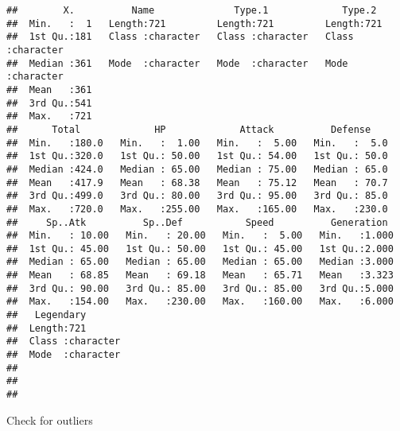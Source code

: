 \documentclass[
]{article}
\newenvironment{Shaded}{\begin{snugshade}}{\end{snugshade}}
\newcommand{\FunctionTok}[1]{\textcolor[rgb]{0.00,0.00,0.00}{#1}}
\newcommand{\NormalTok}[1]{#1}
\newcommand{\OtherTok}[1]{\textcolor[rgb]{0.56,0.35,0.01}{#1}}
\newcommand{\SpecialCharTok}[1]{\textcolor[rgb]{0.00,0.00,0.00}{#1}}
\begin{document}
\begin{Shaded}
\end{Shaded}

\begin{verbatim}
##        X.          Name              Type.1             Type.2         
##  Min.   :  1   Length:721         Length:721         Length:721        
##  1st Qu.:181   Class :character   Class :character   Class :character  
##  Median :361   Mode  :character   Mode  :character   Mode  :character  
##  Mean   :361                                                           
##  3rd Qu.:541                                                           
##  Max.   :721                                                           
##      Total             HP             Attack          Defense     
##  Min.   :180.0   Min.   :  1.00   Min.   :  5.00   Min.   :  5.0  
##  1st Qu.:320.0   1st Qu.: 50.00   1st Qu.: 54.00   1st Qu.: 50.0  
##  Median :424.0   Median : 65.00   Median : 75.00   Median : 65.0  
##  Mean   :417.9   Mean   : 68.38   Mean   : 75.12   Mean   : 70.7  
##  3rd Qu.:499.0   3rd Qu.: 80.00   3rd Qu.: 95.00   3rd Qu.: 85.0  
##  Max.   :720.0   Max.   :255.00   Max.   :165.00   Max.   :230.0  
##     Sp..Atk          Sp..Def           Speed          Generation   
##  Min.   : 10.00   Min.   : 20.00   Min.   :  5.00   Min.   :1.000  
##  1st Qu.: 45.00   1st Qu.: 50.00   1st Qu.: 45.00   1st Qu.:2.000  
##  Median : 65.00   Median : 65.00   Median : 65.00   Median :3.000  
##  Mean   : 68.85   Mean   : 69.18   Mean   : 65.71   Mean   :3.323  
##  3rd Qu.: 90.00   3rd Qu.: 85.00   3rd Qu.: 85.00   3rd Qu.:5.000  
##  Max.   :154.00   Max.   :230.00   Max.   :160.00   Max.   :6.000  
##   Legendary        
##  Length:721        
##  Class :character  
##  Mode  :character  
##                    
##                    
## 
\end{verbatim}

Check for outliers
\end{document}
